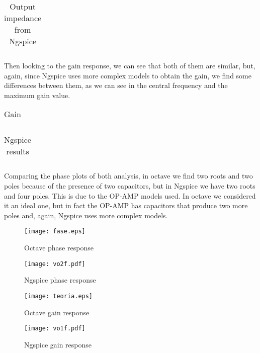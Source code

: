 \begin{table}[H]
\centering
\begin{tabularx}{0.6\textwidth} {
  | >{\raggedright\arraybackslash}X
  | >{\raggedleft\arraybackslash}X | }
 \hline

\end{tabularx}
\caption{Output impedance from Ngspice}
\label{tab18}
\end{table}





Then looking to the gain response, we can see that both of them are similar, but, again, since Ngspice uses more complex models to obtain the gain, we find some differences between them, as we can see in the central frequency and the maximum gain value.

\begin{table}[H]
\centering
\begin{tabularx}{0.6\textwidth} {
  | >{\raggedright\arraybackslash}X
  | >{\raggedleft\arraybackslash}X | }
 \hline

\end{tabularx}
\caption{Gain}
\end{table}


\begin{table}[H]
\centering
\begin{tabularx}{0.6\textwidth} {
  | >{\raggedright\arraybackslash}X
  | >{\raggedleft\arraybackslash}X | }
 \hline

\end{tabularx}
\caption{Ngspice results}
\label{tab16}
\end{table}

Comparing the phase plots of both analysis, in octave we find two roots and two poles because of the presence of two capacitors, but in Ngspice we have two roots and four poles. This is due to the OP-AMP models used. In octave we considered it an ideal one, but in fact the OP-AMP has capacitors that produce two more poles and, again, Ngspice uses more complex models.

\begin{figure}[H] \centering
\texttt{[image: fase.eps]}
\caption{Octave phase response}
\end{figure}

\begin{figure}[H] \centering
\texttt{[image: vo2f.pdf]}
\caption{Ngspice phase response}
\end{figure}

\begin{figure}[H] \centering
\texttt{[image: teoria.eps]}
\caption{Octave gain response}
\end{figure}

\begin{figure}[H] \centering
\texttt{[image: vo1f.pdf]}
\caption{Ngspice gain response}
\end{figure}

